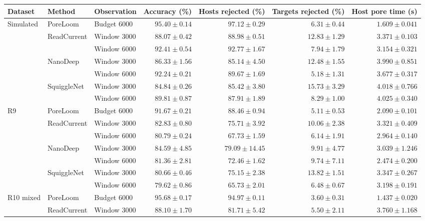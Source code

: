 \begingroup\setlength{\tabcolsep}{3.5pt}
\begin{tabular}{@{}lllrrrr@{}}
\toprule
Dataset & Method & Observation & Accuracy (\%) & Hosts rejected (\%) & Targets rejected (\%) & Host pore time (s)\\\midrule
Simulated & PoreLoom & Budget 6000 & $\mathbf{95.40 \pm 0.14}$ & $\mathbf{97.12 \pm 0.29}$ & $6.31 \pm 0.44$ & $\mathbf{1.609 \pm 0.041}$\\
 & ReadCurrent & Window 3000 & $88.07 \pm 0.42$ & $88.98 \pm 0.51$ & $12.83 \pm 1.29$ & $3.371 \pm 0.103$\\
 &  & Window 6000 & $92.41 \pm 0.54$ & $92.77 \pm 1.67$ & $7.94 \pm 1.79$ & $3.154 \pm 0.321$\\
 & NanoDeep & Window 3000 & $86.33 \pm 1.56$ & $85.14 \pm 4.50$ & $12.48 \pm 1.55$ & $3.990 \pm 0.851$\\
 &  & Window 6000 & $92.24 \pm 0.21$ & $89.67 \pm 1.69$ & $\mathbf{5.18 \pm 1.31}$ & $3.677 \pm 0.317$\\
 & SquiggleNet & Window 3000 & $84.84 \pm 0.26$ & $85.42 \pm 3.80$ & $15.73 \pm 3.29$ & $4.018 \pm 0.766$\\
 &  & Window 6000 & $89.81 \pm 0.87$ & $87.91 \pm 1.89$ & $8.29 \pm 1.00$ & $4.025 \pm 0.340$\\
\addlinespace
R9 & PoreLoom & Budget 6000 & $\mathbf{91.67 \pm 0.21}$ & $\mathbf{88.46 \pm 0.94}$ & $\mathbf{5.11 \pm 0.53}$ & $\mathbf{2.090 \pm 0.101}$\\
 & ReadCurrent & Window 3000 & $82.83 \pm 0.80$ & $75.71 \pm 3.92$ & $10.06 \pm 2.38$ & $3.321 \pm 0.409$\\
 &  & Window 6000 & $80.79 \pm 0.24$ & $67.73 \pm 1.59$ & $6.14 \pm 1.91$ & $2.964 \pm 0.140$\\
 & NanoDeep & Window 3000 & $84.59 \pm 4.85$ & $79.09 \pm 14.45$ & $9.91 \pm 4.77$ & $3.039 \pm 1.246$\\
 &  & Window 6000 & $81.36 \pm 2.81$ & $72.46 \pm 1.62$ & $9.74 \pm 7.11$ & $2.474 \pm 0.200$\\
 & SquiggleNet & Window 3000 & $80.66 \pm 0.46$ & $75.15 \pm 2.38$ & $13.82 \pm 1.51$ & $3.347 \pm 0.267$\\
 &  & Window 6000 & $79.62 \pm 0.86$ & $65.73 \pm 2.01$ & $6.48 \pm 0.67$ & $3.198 \pm 0.191$\\
\addlinespace
R10 mixed & PoreLoom & Budget 6000 & $\mathbf{95.68 \pm 0.17}$ & $\mathbf{94.97 \pm 0.11}$ & $\mathbf{3.60 \pm 0.31}$ & $\mathbf{1.437 \pm 0.020}$\\
 & ReadCurrent & Window 3000 & $88.10 \pm 1.70$ & $81.71 \pm 5.42$ & $5.50 \pm 2.11$ & $3.760 \pm 1.168$\\

\end{tabular}
